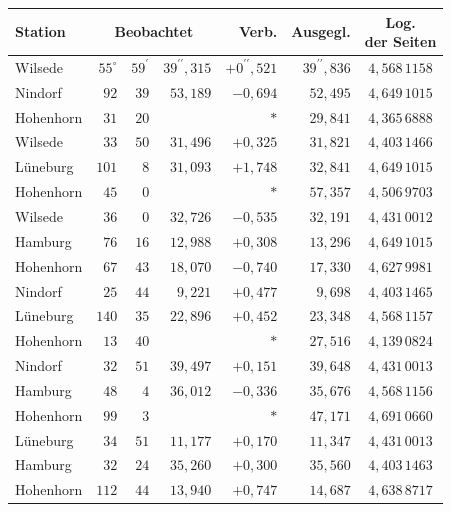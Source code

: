 \begin{center}\small\setlength{\tabcolsep}{5pt}\renewcommand{\arraystretch}{1.04}
\begin{tabular}{|l|r@{\;}r@{\;}r|r|r|c|}\hline
Station & \multicolumn{3}{c|}{Beobachtet} & Verb. & Ausgegl. & \shortstack{Log.\\der Seiten}\\\hline
Wilsede & $55^{\circ}$ & $59^{\prime}$ & $39^{\prime\prime}{,}315$ & $+0^{\prime\prime}{,}521$ & $39^{\prime\prime}{,}836$ & $4{,}568\,1158$\\
Nindorf & $92$ & $39$ & $53{,}189$ & $-0{,}694$ & $52{,}495$ & $4{,}649\,1015$\\
Hohenhorn & $31$ & $20$ &  & $*$ & $29{,}841$ & $4{,}365\,6888$\\[3pt]
Wilsede & $33$ & $50$ & $31{,}496$ & $+0{,}325$ & $31{,}821$ & $4{,}403\,1466$\\
Lüneburg & $101$ & $8$ & $31{,}093$ & $+1{,}748$ & $32{,}841$ & $4{,}649\,1015$\\
Hohenhorn & $45$ & $0$ &  & $*$ & $57{,}357$ & $4{,}506\,9703$\\[3pt]
Wilsede & $36$ & $0$ & $32{,}726$ & $-0{,}535$ & $32{,}191$ & $4{,}431\,0012$\\
Hamburg & $76$ & $16$ & $12{,}988$ & $+0{,}308$ & $13{,}296$ & $4{,}649\,1015$\\
Hohenhorn & $67$ & $43$ & $18{,}070$ & $-0{,}740$ & $17{,}330$ & $4{,}627\,9981$\\[3pt]
Nindorf & $25$ & $44$ & $9{,}221$ & $+0{,}477$ & $9{,}698$ & $4{,}403\,1465$\\
Lüneburg & $140$ & $35$ & $22{,}896$ & $+0{,}452$ & $23{,}348$ & $4{,}568\,1157$\\
Hohenhorn & $13$ & $40$ &  & $*$ & $27{,}516$ & $4{,}139\,0824$\\[3pt]
Nindorf & $32$ & $51$ & $39{,}497$ & $+0{,}151$ & $39{,}648$ & $4{,}431\,0013$\\
Hamburg & $48$ & $4$ & $36{,}012$ & $-0{,}336$ & $35{,}676$ & $4{,}568\,1156$\\
Hohenhorn & $99$ & $3$ &  & $*$ & $47{,}171$ & $4{,}691\,0660$\\[3pt]
Lüneburg & $34$ & $51$ & $11{,}177$ & $+0{,}170$ & $11{,}347$ & $4{,}431\,0013$\\
Hamburg & $32$ & $24$ & $35{,}260$ & $+0{,}300$ & $35{,}560$ & $4{,}403\,1463$\\
Hohenhorn & $112$ & $44$ & $13{,}940$ & $+0{,}747$ & $14{,}687$ & $4{,}638\,8717$\\
\end{tabular}\end{center}

